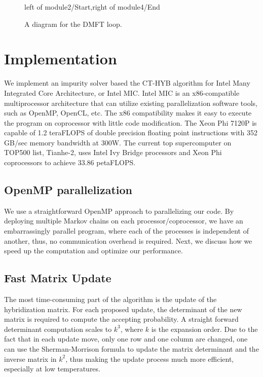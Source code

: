 \begin{figure}
  \centering
{}
{left of module2/Start,right of module4/End}
  \caption{A diagram for the DMFT loop.}
\end{figure}

\section{Implementation}
\label{ssec:hyb-implementation}
We implement an impurity solver based the CT-HYB algorithm for 
Intel Many Integrated Core Architecture, or Intel MIC. Intel MIC is an 
x86-compatible multiprocessor architecture that can utilize existing 
parallelization software tools, such as OpenMP, OpenCL, etc. The x86 
compatibility makes it easy to execute the program on coprocessor with little
code modification. The Xeon Phi 7120P is capable of 1.2 teraFLOPS of double 
precision floating point instructions with 352 GB/sec memory bandwidth at 300W.
The current top supercomputer on TOP500 list, Tianhe-2, uses Intel Ivy Bridge
processors and Xeon Phi coprocessors to achieve 33.86 petaFLOPS.

\subsection{OpenMP parallelization}
We use a straightforward OpenMP approach to parallelizing our code. By deploying
multiple Markov chains on each processor/coprocessor, we have an embarrassingly 
parallel program, where each of the processes is independent of another, thus, no
communication overhead is required. Next, we discuss how we speed up the 
computation and optimize our performance. 

\subsection{Fast Matrix Update}
\label{sec:cthyb_fmu}
The most time-consuming part of the algorithm is the update of the hybridization
matrix. For each proposed update, the determinant of the new matrix is required
to compute the accepting probability. A straight forward determinant computation
scales to $k^3$, where $k$ is the expansion order. Due to the fact that in each
update move, only one row and one column are changed, one can use the 
Sherman-Morrison formula to update the matrix determinant and the inverse 
matrix in $k^2$, thus making the update process much more efficient, especially 
at low temperatures.

